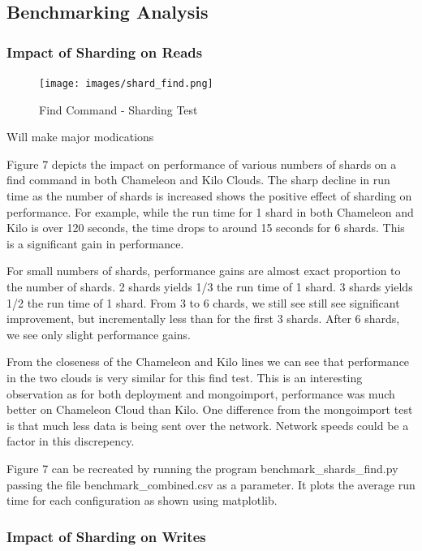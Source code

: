 \documentclass[9pt,twocolumn,twoside]{../../styles/osajnl}
\begin{document}
\subsection{Benchmarking Analysis}

\subsubsection{Impact of Sharding on Reads}

\begin{figure}[!ht]
  \texttt{[image: images/shard\_find.png]}
  \caption{Find Command - Sharding Test}
\end{figure}

Will make major modications

Figure 7 depicts the impact on performance of various numbers of shards on a find command in both Chameleon and Kilo Clouds.  The sharp decline in run time as the number of shards is increased shows the positive effect of sharding on performance.  For example, while the run time for 1 shard in both Chameleon and Kilo is over 120 seconds, the time drops to around 15 seconds for 6 shards.  This is a significant gain in performance.  

For small numbers of shards, performance gains are almost exact proportion to the number of shards.  2 shards yields 1/3 the run time of 1 shard.  3 shards yields 1/2 the run time of 1 shard.  From 3 to 6 chards, we still see still see significant improvement, but incrementally less than for the first 3 shards.  After 6 shards, we see only slight performance gains.

From the closeness of the Chameleon and Kilo lines we can see that performance in the two clouds is very similar for this find test.  This is an interesting observation as for both deployment and mongoimport, performance was much better on Chameleon Cloud than Kilo.  One difference from the mongoimport test is that much less data is being sent over the network.  Network speeds could be a factor in this discrepency.

Figure 7 can be recreated by running the program benchmark\_shards\_find.py passing the file benchmark\_combined.csv as a parameter.  It plots the average run time for each configuration as shown using matplotlib.



\subsubsection{Impact of Sharding on Writes}
\end{document}
